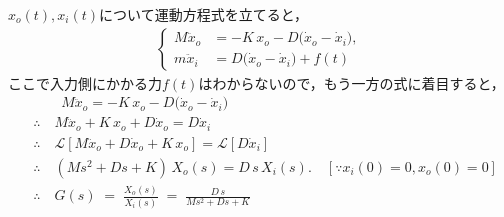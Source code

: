 \documentclass[a4paper,12pt]{article}
\begin{document}
\begin{tcolorbox}
        \({x}_o(t),{x}_i(t)\)について運動方程式を立てると，
    \begin{align*}
        \left\{
            \begin{aligned}
                M\ddot{x}_o &= -K\,x_o - D\bigl(\dot{x}_o-\dot{x}_i\bigr),\\
                m\ddot{x}_i &= D\bigl(\dot{x}_o-\dot{x}_i\bigr) + f(t)
            \end{aligned}
        \right.
    \end{align*}
        ここで入力側にかかる力\(f(t)\)はわからないので，もう一方の式に着目すると，
    \begin{align*}
        &\qquad M\ddot{x}_o = -K\,x_o - D\bigl(\dot{x}_o-\dot{x}_i\bigr) \\
        &\therefore \quad M\ddot{x}_o + K\,x_o + D \dot{x}_o=D \dot{x}_i \\
        &\therefore \quad \mathcal{L} \left[  M\ddot{x}_o + D \dot{x}_o + K\,x_o  \right] 
        =\mathcal{L} \left[ D \dot{x}_i \right] \\
        &\therefore \quad (M s^2 + D s + K)\,X_o(s) = D\,s\,X_i(s). \quad [\because x_i(0)= 0, x_o(0)=0 ]\\
        &\therefore \quad G(s) \;=\;\frac{X_o(s)}{X_i(s)}
        \;=\;\frac{D\,s}{M s^2 + D s + K}
    \end{align*}


\end{tcolorbox}
\end{document}
